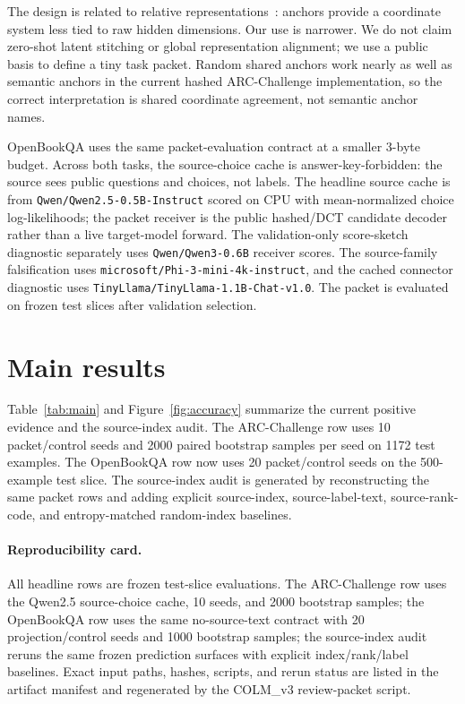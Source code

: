\documentclass{article}
\newcommand{\arc}{ARC-Challenge}
\newcommand{\obqa}{OpenBookQA}
\begin{document}
The design is related to relative representations~\citep{Moschella2023Relative}: anchors provide a coordinate system less tied to raw hidden dimensions. Our use is narrower. We do not claim zero-shot latent stitching or global representation alignment; we use a public basis to define a tiny task packet. Random shared anchors work nearly as well as semantic anchors in the current hashed \arc{} implementation, so the correct interpretation is shared coordinate agreement, not semantic anchor names.

\obqa{} uses the same packet-evaluation contract at a smaller 3-byte budget. Across both tasks, the source-choice cache is answer-key-forbidden: the source sees public questions and choices, not labels. The headline source cache is from \texttt{Qwen/Qwen2.5-0.5B-Instruct} scored on CPU with mean-normalized choice log-likelihoods; the packet receiver is the public hashed/DCT candidate decoder rather than a live target-model forward. The validation-only score-sketch diagnostic separately uses \texttt{Qwen/Qwen3-0.6B} receiver scores. The source-family falsification uses \texttt{microsoft/Phi-3-mini-4k-instruct}, and the cached connector diagnostic uses \texttt{TinyLlama/TinyLlama-1.1B-Chat-v1.0}. The packet is evaluated on frozen test slices after validation selection.

\section{Main results}

Table~\ref{tab:main} and Figure~\ref{fig:accuracy} summarize the current positive evidence and the source-index audit. The \arc{} row uses 10 packet/control seeds and 2000 paired bootstrap samples per seed on 1172 test examples. The \obqa{} row now uses 20 packet/control seeds on the 500-example test slice. The source-index audit is generated by reconstructing the same packet rows and adding explicit source-index, source-label-text, source-rank-code, and entropy-matched random-index baselines.

\paragraph{Reproducibility card.}
All headline rows are frozen test-slice evaluations. The \arc{} row uses the Qwen2.5 source-choice cache, 10 seeds, and 2000 bootstrap samples; the \obqa{} row uses the same no-source-text contract with 20 projection/control seeds and 1000 bootstrap samples; the source-index audit reruns the same frozen prediction surfaces with explicit index/rank/label baselines. Exact input paths, hashes, scripts, and rerun status are listed in the artifact manifest and regenerated by the COLM\_v3 review-packet script.
\end{document}
